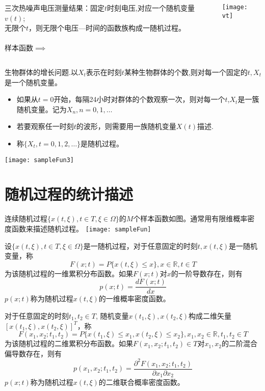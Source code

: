 \begin{frame}
\begin{columns}
\begin{example}
三次热噪声电压测量结果：固定$t$时刻电压,对应一个随机变量$v(t)$; \\
无限个$t$，则无限个电压---时间的函数族构成一随机过程。\\
~\\
样本函数$\implies$
\end{example}
\texttt{[image: vt]}
\end{columns}
\end{frame}

\begin{frame}
\begin{example}
生物群体的增长问题.以$X_t$表示在时刻$t$某种生物群体的个数,则对每一个固定的$t,X_t$是一个随机变量。　
\begin{itemize}
\item 如果从$t=0$开始，每隔24小时对群体的个数观察一次，则对每一个$t$,$X_t$是一簇随机变量。记为$X_n,n=0,1,\dots$
\item 若要观察任一时刻$t$的波形，则需要用一族随机变量$X(t)$描述. 
\item 称$\{X_t,t=0,1,2,\dots\}$是随机过程。
\end{itemize}	
\end{example}
\texttt{[image: sampleFun3]}	
\end{frame}

\section{随机过程的统计描述}

\begin{frame}
连续随机过程$\{x(t,\xi),t\in T,\xi\in\Omega \}$的$M$个样本函数如图。通常用有限维概率密度函数来描述随机过程。
\texttt{[image: sampleFun]}
\end{frame}

\begin{frame}
设$\{x(t,\xi),t\in T,\xi\in\Omega \}$是一随机过程，对于任意固定的时刻$t,x(t,\xi)$是一随机变量，称
\[F(x;t)=P\{x(t,\xi)\le x\},x\in\mathbb{R},t\in T \]
为该随机过程的一维累积分布函数。如果$F(x;t)$对$x$的一阶导数存在，则有
\[p(x;t)=\frac{dF(x;t)}{dx}\]
$p(x;t)$称为随机过程$x(t,\xi)$的一维概率密度函数。
\end{frame}

\begin{frame}
对于任意固定的时刻$t_1,t_2\in T$, 随机变量$x(t_1,\xi),x(t_2,\xi)$构成二维矢量$[x(t_1,\xi),x(t_2,\xi)]^T$，称
\[F(x_1,x_2;t_1,t_2)=P\{x(t_1,\xi)\le x_1,x(t_2,\xi)\le x_2\},x_1,x_2\in\mathbb{R},t_1,t_2\in T \]
为该随机过程的二维累积分布函数。如果$F(x_1,x_2;t_1,t_2)\in T$对$x_1,x_2$的二阶混合偏导数存在，则有
\[p(x_1,x_2;t_1,t_2)=\frac{\partial^2 F(x_1,x_2;t_1,t_2)}{\partial x_1\partial x_2}\]
$p(x;t)$称为随机过程$x(t,\xi)$的二维联合概率密度函数。
\end{frame}

